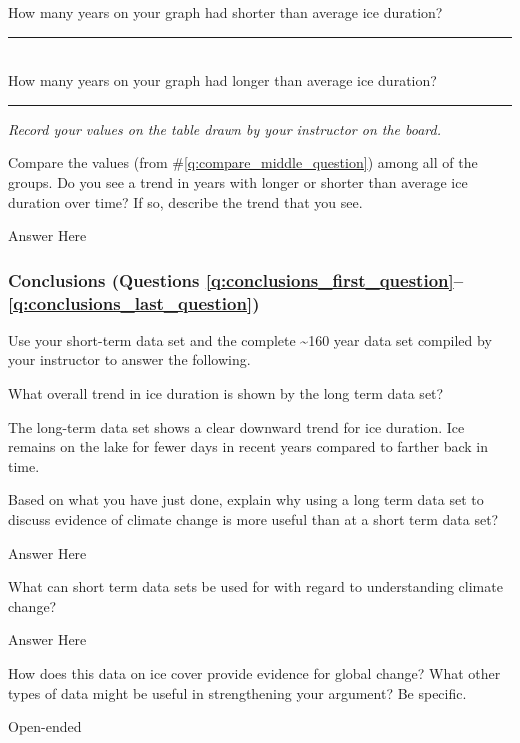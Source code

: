 \documentclass[12pt, hidelinks, addpoints]{exam}
\newcommand*\AnswerBox[2]{%
    \parbox[t][#1]{0.92\textwidth}{%
    \begin{solution}#2\end{solution}}
    \vspace*{\stretch{1}}
}
\begin{document}
\begin{questions}
\vspace*{\baselineskip}

\question[1]\label{q:compare_middle_question}
How many years on your graph had shorter than average ice duration? \rule{1.5cm}{0.4pt} \\[1.5\baselineskip]
How many years on your graph had longer than average ice duration? \rule{1.5cm}{0.4pt}


\emph{Record your values on the table drawn by your instructor on the
board.}

\question[1]\label{q:compare_last_question}
Compare the values (from \#\ref{q:compare_middle_question}) among all of the groups. Do you see a
trend in years with longer or shorter than average ice duration over
time? If so, describe the trend that you see.

\AnswerBox{1\baselineskip}{Answer Here}

\subsubsection*{Conclusions (Questions \ref{q:conclusions_first_question}–\ref{q:conclusions_last_question})}

Use your short-term data set and
the complete \textasciitilde{}160 year data set compiled by your
instructor to answer the following.

\question[1]\label{q:conclusions_first_question}
What overall trend in ice duration is shown by the long term data
set?

\AnswerBox{3\baselineskip}{The long-term data set shows a clear downward trend for ice duration. Ice remains on the lake for fewer days in recent years compared to farther back in time.}

\question[1]
Based on what you have just done, explain why using a long term data
set to discuss evidence of climate change is more useful than at a short
term data set?

\AnswerBox{3\baselineskip}{Answer Here}

\question[1]
What can short term data sets be used for with regard to
understanding climate change?

\AnswerBox{3\baselineskip}{Answer Here}

\question[1]\label{q:conclusions_last_question}
How does this data on ice cover provide evidence for global change?
What other types of data might be useful in strengthening your argument?
Be specific.

\AnswerBox{3\baselineskip}{%
Open-ended%
}
\end{questions}
\end{document}
